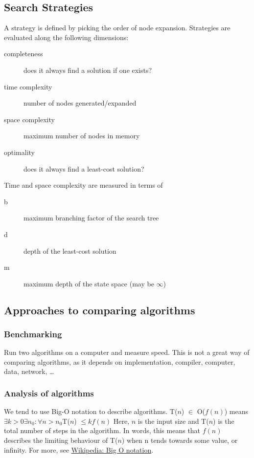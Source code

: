 \subsection{Search Strategies}
A strategy is defined by picking the order of node expansion. Strategies are
evaluated along the following dimensions:
\begin{description}
    \item[completeness] does it always find a solution if one exists?
    \item[time complexity] number of nodes generated/expanded
    \item[space complexity] maximum number of nodes in memory
    \item[optimality] does it always find a least-cost solution?
\end{description}

Time and space complexity are measured in terms of
\begin{description}
    \item[b] maximum branching factor of the search tree
    \item[d] depth of the least-cost solution
    \item[m] maximum depth of the state space (may be $\infty$)
\end{description}

\subsection{Approaches to comparing algorithms}
\subsubsection{Benchmarking}
Run two algorithms on a computer and measure speed. This is not a great way of
comparing algorithms, as it depends on implementation, compiler, computer,
data, network, \ldots
\subsubsection{Analysis of algorithms}
We tend to use Big-O notation to describe algorithms.
T($n$) $\in$ O($f(n)$) means $\exists k > 0 \exists n_0 : \forall n > n_0 $T($n$) $\leq kf(n)$
Here, $n$ is the input size and T($n$) is the total number of steps in the
algorithm. In words, this means that $f(n)$ describes the limiting behaviour of
T($n$) when n tends towards some value, or infinity. For more, see
\href{http://en.wikipedia.org/wiki/Big_O_notation}{Wikipedia: Big O notation}.

